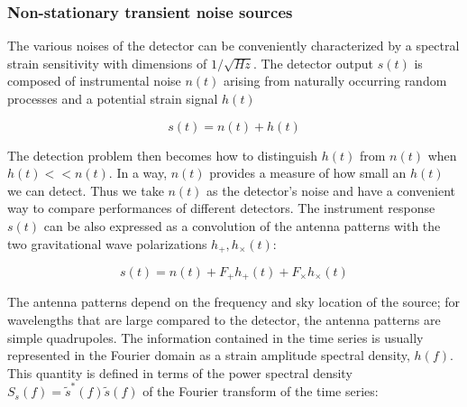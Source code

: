 \documentclass[binding=0.6cm, LaM]{sapthesis}
\begin{document}
%
%
%

\subsubsection{Non-stationary transient noise sources}
	
	The various noises of the detector can be conveniently characterized by a spectral strain
        sensitivity with dimensions of $1/\sqrt{Hz}$.
        The detector output $s(t)$ is composed of instrumental noise $n(t)$ arising from
        naturally occurring random processes and a potential strain signal $h(t)$

                \begin{equation}
                s(t) = n(t) + h(t)
                \end{equation}

        The detection problem then becomes how to distinguish $h(t)$ from $n(t)$ when $h(t) << n(t)$.
        In a way, $n(t)$ provides a measure of how small an $h(t)$ we can detect.
        Thus we take $n(t)$ as the detector’s noise and have a convenient way to
        compare performances of different detectors.
	The instrument response $s(t)$ can be also expressed as a convolution of the antenna patterns 
	with the two gravitational wave polarizations $h_{+}, h_{\times}(t)$:
	
		\begin{equation}
		s(t) = n(t) +  F_{+}h_{+} (t) + F_{\times}h_{\times}(t)
		\end{equation} 

	The antenna patterns depend on the frequency and sky location of the source; 
	for wavelengths that are large compared to the detector, the antenna patterns are simple quadrupoles.
	The information contained in the time series is usually represented in the Fourier domain 
	as a strain amplitude spectral density, $h(f)$.
	This quantity is defined in terms of the power spectral density $S_s(f) = \tilde s^{*}(f) \tilde s(f)$
	of the Fourier transform of the time series:
\end{document}
